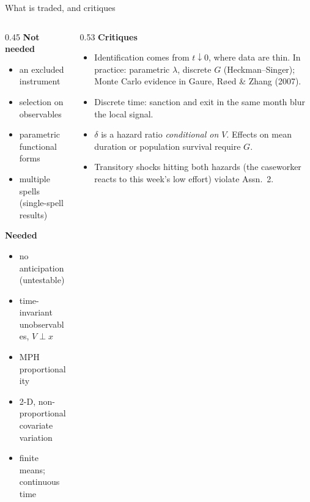 \documentclass[aspectratio=169,10pt]{beamer}
\newcommand{\1}{\mathbf{1}}
\begin{document}
\begin{frame}{What is traded, and critiques}
  \begin{columns}[T]
    \begin{column}{0.45\textwidth}
      \textbf{Not needed}
      \begin{itemize}
        \item an excluded instrument
        \item selection on observables
        \item parametric functional forms
        \item multiple spells (single-spell results)
      \end{itemize}
      \textbf{Needed}
      \begin{itemize}
        \item no anticipation (untestable)
        \item time-invariant unobservables, $V\perp x$
        \item MPH proportionality
        \item 2-D, non-proportional covariate variation
        \item finite means; continuous time
      \end{itemize}
    \end{column}
    \begin{column}{0.53\textwidth}
      \textbf{Critiques}
      \begin{itemize}
        \item Identification comes from $t\downarrow0$, where data are thin. In practice: parametric $\lambda$, discrete $G$ (Heckman--Singer); Monte Carlo evidence in Gaure, R\o ed \& Zhang (2007).
        \item Discrete time: sanction and exit in the same month blur the local signal.
        \item $\delta$ is a hazard ratio \emph{conditional on $V$}. Effects on mean duration or population survival require $G$.
        \item Transitory shocks hitting both hazards (the caseworker reacts to this week's low effort) violate Assn.~2.
      \end{itemize}
    \end{column}
  \end{columns}
\end{frame}
\end{document}
